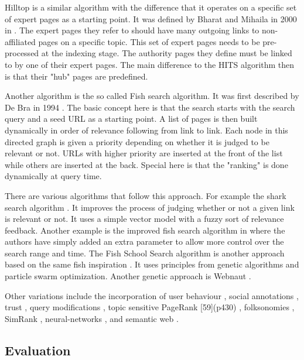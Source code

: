 Hilltop is a similar algorithm with the difference that it operates on a specific set of expert pages as a starting point. It was defined by Bharat and Mihaila in 2000 in \citep{Bharat2000}. The expert pages they refer to should have many outgoing links to non-affiliated pages on a specific topic. This set of expert pages needs to be pre-processed at the indexing stage. The authority pages they define must be linked to by one of their expert pages. The main difference to the HITS algorithm then is that their "hub" pages are predefined.

Another algorithm is the so called Fish search algorithm. It was first described by De Bra in 1994 \citep{Debra1994, Debra1994a, Debra}. The basic concept here is that the search starts with the search query and a seed URL as a starting point. A list of pages is then built dynamically in order of relevance following from link to link. Each node in this directed graph is given a priority depending on whether it is judged to be relevant or not. URLs with higher priority are inserted at the front of the list while others are inserted at the back. Special here is that the "ranking" is done dynamically at query time.

There are various algorithms that follow this approach. For example the shark search algorithm \citep{Hersovici1998}. It improves the process of judging whether or not a given link is relevant or not. It uses a simple vector model with a fuzzy sort of relevance feedback. Another example is the improved fish search algorithm in \citep{Luo2005} where the authors have simply added an extra parameter to allow more control over the search range and time. The Fish School Search algorithm is another approach based on the same fish inspiration \citep{BastosFilho2008}. It uses principles from genetic algorithms and particle swarm optimization. Another genetic approach is Webnaut \citep{Nick2001}.

Other variations include the incorporation of user behaviour \citep{Agichtein2006}, social annotations \citep{Bao2007}, trust \citep{Garcia-Molina2004}, query modifications \citep{Glover2001}, topic sensitive PageRank [59](p430) \citep{Haveliwala2003}, folksonomies \citep{Hotho}, SimRank \citep{Jeh}, neural-networks \citep{Shu1999}, and semantic web \citep{Widyantoro2001,Du2007,Ding,Kamps,Taye2009}.


\subsection{Evaluation}

